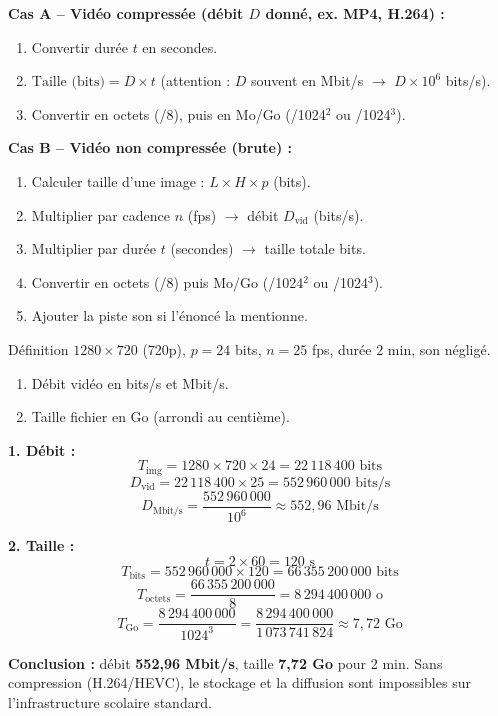\documentclass[11pt]{article}
\begin{document}
\begin{methode}
\textbf{Cas A -- Vidéo compressée (débit $D$ donné, ex. MP4, H.264) :}
\begin{enumerate}
\item Convertir durée $t$ en secondes.
\item $\text{Taille (bits)} = D \times t$ (attention : $D$ souvent en Mbit/s $\to$ $D \times 10^6$ bits/s).
\item Convertir en octets (/8), puis en Mo/Go (/1024$^2$ ou /1024$^3$).
\end{enumerate}

\textbf{Cas B -- Vidéo non compressée (brute) :}
\begin{enumerate}
\item Calculer taille d'une image : $L \times H \times p$ (bits).
\item Multiplier par cadence $n$ (fps) $\to$ débit $D_{\text{vid}}$ (bits/s).
\item Multiplier par durée $t$ (secondes) $\to$ taille totale bits.
\item Convertir en octets (/8) puis Mo/Go (/1024$^2$ ou /1024$^3$).
\item Ajouter la piste son si l'énoncé la mentionne.
\end{enumerate}
\end{methode}

\begin{exoresolu}
Définition $1280 \times 720$ (720p), $p = 24$ bits, $n = 25$ fps, durée $2$ min, son négligé.
\begin{enumerate}
\item Débit vidéo en bits/s et Mbit/s.
\item Taille fichier en Go (arrondi au centième).
\end{enumerate}
\tcblower
\textbf{1. Débit :}
\[
T_{\text{img}} = 1280 \times 720 \times 24 = 22\,118\,400 \text{ bits}
\]
\[
D_{\text{vid}} = 22\,118\,400 \times 25 = 552\,960\,000 \text{ bits/s}
\]
\[
D_{\text{Mbit/s}} = \frac{552\,960\,000}{10^6} \approx 552,96 \text{ Mbit/s}
\]

\textbf{2. Taille :}
\[
t = 2 \times 60 = 120 \text{ s}
\]
\[
T_{\text{bits}} = 552\,960\,000 \times 120 = 66\,355\,200\,000 \text{ bits}
\]
\[
T_{\text{octets}} = \frac{66\,355\,200\,000}{8} = 8\,294\,400\,000 \text{ o}
\]
\[
T_{\text{Go}} = \frac{8\,294\,400\,000}{1024^3} = \frac{8\,294\,400\,000}{1\,073\,741\,824} \approx 7,72 \text{ Go}
\]

\textbf{Conclusion :} débit \textbf{552,96 Mbit/s}, taille \textbf{7,72 Go} pour 2 min. Sans compression (H.264/HEVC), le stockage et la diffusion sont impossibles sur l'infrastructure scolaire standard.
\end{exoresolu}
\end{document}
